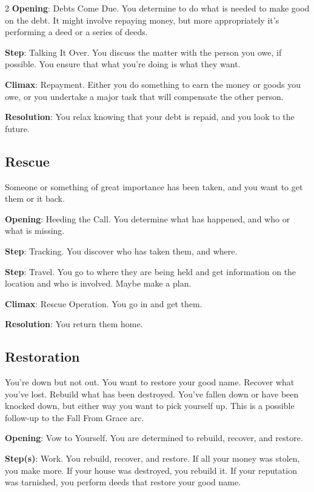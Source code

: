\begin{multicols}{2}
\textbf{Opening}: Debts Come Due. You determine to do what is needed to make good on the debt. It might involve repaying money, but more appropriately it’s performing a deed or a series of deeds.

\textbf{Step}: Talking It Over. You discuss the matter with the person you owe, if possible. You ensure that what you’re doing is what they want.

\textbf{Climax}: Repayment. Either you do something to earn the money or goods you owe, or you undertake a major task that will compensate the other person. 

\textbf{Resolution}: You relax knowing that your debt is repaid, and you look to the future.

\subsection{Rescue}

Someone or something of great importance has been taken, and you want to get them or it back.

\textbf{Opening}: Heeding the Call. You determine what has happened, and who or what is missing.

\textbf{Step}: Tracking. You discover who has taken them, and where.

\textbf{Step}: Travel. You go to where they are being held and get information on the location and who is involved. Maybe make a plan.

\textbf{Climax}: Rescue Operation. You go in and get them. 

\textbf{Resolution}: You return them home.

\subsection{Restoration}

You’re down but not out. You want to restore your good name. Recover what you’ve lost. Rebuild what has been destroyed. You’ve fallen down or have been knocked down, but either way you want to pick yourself up. This is a possible follow-up to the Fall From Grace arc.

\textbf{Opening}: Vow to Yourself. You are determined to rebuild, recover, and restore.

\textbf{Step(s)}: Work. You rebuild, recover, and restore. If all your money was stolen, you make more. If your house was destroyed, you rebuild it. If your reputation was tarnished, you perform deeds that restore your good name.


\end{multicols}
